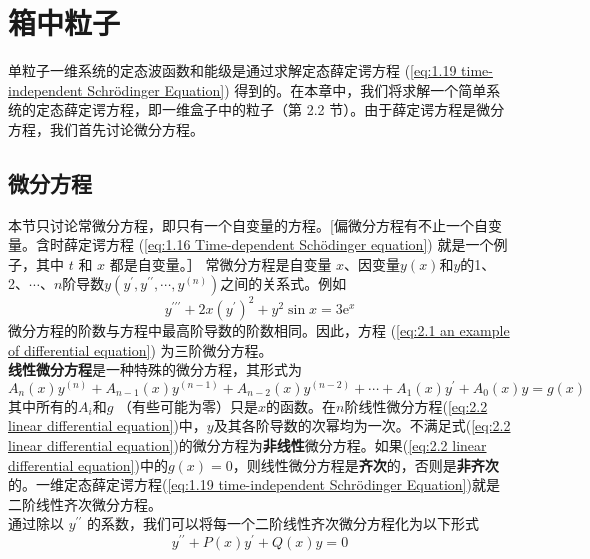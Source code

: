 \chapter{箱中粒子}
	单粒子一维系统的定态波函数和能级是通过求解定态薛定谔方程 (\ref{eq:1.19 time-independent Schrödinger Equation}) 得到的。在本章中，我们将求解一个简单系统的定态薛定谔方程，即一维盒子中的粒子（第 2.2 节）。由于薛定谔方程是微分方程，我们首先讨论微分方程。
\section{微分方程}
	本节只讨论常微分方程，即只有一个自变量的方程。[偏微分方程有不止一个自变量。含时薛定谔方程 (\ref{eq:1.16 Time-dependent Schödinger equation}) 就是一个例子，其中 $t$ 和 $x$ 都是自变量。］ 
	常微分方程是自变量 $x$、因变量$y\left(x\right)$和$y$的1、2、$\cdots$、$n$阶导数$y\left(y^{\prime},y^{\prime\prime}, \cdots, y^{\left(n\right)}\right)$之间的关系式。例如
	\begin{equation}
		y^{\prime\prime\prime}+2x\left(y^{\prime}\right)^2+y^2\sin x = 3\mathrm{e}^x
		\label{eq:2.1 an example of differential equation}
	\end{equation}
	微分方程的阶数与方程中最高阶导数的阶数相同。因此，方程 (\ref{eq:2.1 an example of differential equation}) 为三阶微分方程。\\
	\indent \textbf{线性微分方程}是一种特殊的微分方程，其形式为
	\begin{equation}
		A_n\left(x\right)y^{\left(n\right)}+A_{n-1}\left(x\right)y^{\left(n-1\right)}+A_{n-2}\left(x\right)y^{\left(n-2\right)}+\cdots+A_1\left(x\right)y^{\prime}+A_0\left(x\right)y=g\left(x\right)
		\label{eq:2.2 linear differential equation}
	\end{equation}
	其中所有的$A_i$和$g$ （有些可能为零）只是$x$的函数。在$n$阶线性微分方程(\ref{eq:2.2 linear differential equation})中，$y$及其各阶导数的次幂均为一次。不满足式(\ref{eq:2.2 linear differential equation})的微分方程为\textbf{非线性}微分方程。如果(\ref{eq:2.2 linear differential equation})中的$g\left(x\right)=0$，则线性微分方程是\textbf{齐次}的，否则是\textbf{非齐次}的。一维定态薛定谔方程(\ref{eq:1.19 time-independent Schrödinger Equation})就是二阶线性齐次微分方程。\\
	\indent 通过除以 $y^{\prime \prime}$ 的系数，我们可以将每一个二阶线性齐次微分方程化为以下形式
	\begin{equation}
		y^{\prime\prime}+P\left(x\right)y^{\prime}+Q\left(x\right)y=0
		\label{eq:2.3 linear homogeneous differential equation}
	\end{equation}
